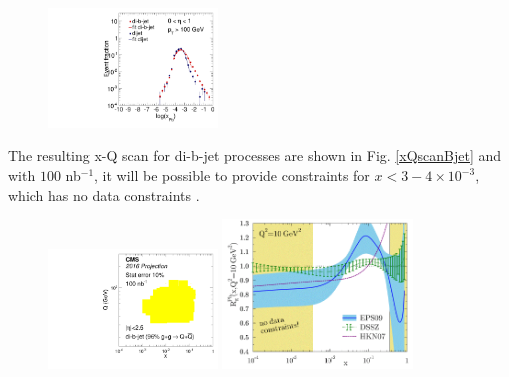 \begin{figure}[h]
\begin{center}
\includegraphics[width= 0.4\textwidth]{figures/DistCompareBJetInclusive.pdf}
\caption{}
\label{fig:distX}
\end{center}
\end{figure}

The resulting x-Q scan for di-b-jet processes are shown in Fig. \ref{xQscanBjet} and with $100$ nb$^{-1}$, it will be possible to provide constraints for $x < 3-4 \times 10^{-3}$, which has no data constraints \cite{}.

\begin{figure}[h]
\begin{center}
\includegraphics[width= 0.4\textwidth]{figures/filledQX_Lumi100_BJet.pdf}
\includegraphics[width= 0.45\textwidth]{figures/eps09_10GeV_Gluon_nPDF.png}
\caption{}
\label{fig:xQscanBjet}
\end{center}
\end{figure}

